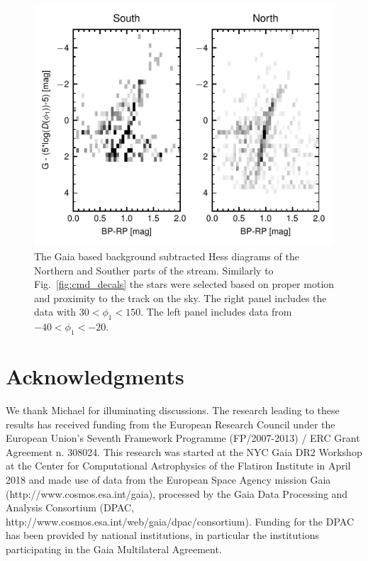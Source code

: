 \documentclass[a4paper,useAMS,usenatbib]{mnras}
\begin{document}
\begin{figure}
\includegraphics{gaia_cmd.pdf}
\caption{The Gaia based background subtracted Hess diagrams of the Northern and Souther parts of the stream. Similarly to Fig.~\ref{fig:cmd_decals} the stars were selected based on proper motion and proximity to the track on the sky. The right panel includes the data with $30<\phi_1<150$. The left panel includes data from $-40<\phi_1<-20$.}
\end{figure}
\section*{Acknowledgments}

We thank Michael for illuminating discussions. The research leading to
these results has received funding from the European Research Council
under the European Union's Seventh Framework Programme (FP/2007-2013)
/ ERC Grant Agreement n. 308024. This research was started at the NYC
Gaia DR2 Workshop at the Center for Computational Astrophysics of the
Flatiron Institute in April 2018 and made use of data from the
European Space Agency mission Gaia (http://www.cosmos.esa.int/gaia),
processed by the Gaia Data Processing and Analysis Consortium (DPAC,
http://www.cosmos.esa.int/web/gaia/dpac/consortium). Funding for the
DPAC has been provided by national institutions, in particular the
institutions participating in the Gaia Multilateral Agreement.



\label{lastpage}
\end{document}
